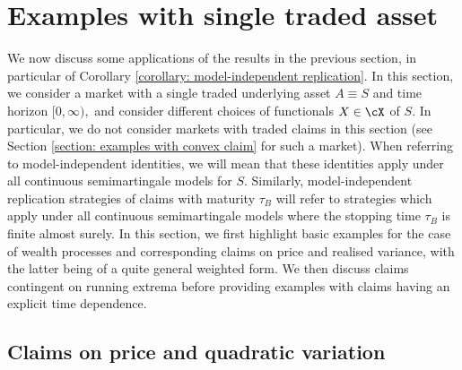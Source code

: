 \documentclass[11pt]{article}
\begin{document}
\section{Examples with single traded asset}
\label{section: examples}

We now discuss some applications of the results in the previous section, in particular of Corollary \ref{corollary: model-independent replication}. In this section, we consider a market with a single traded underlying asset $A \equiv S$ and time horizon $[0,\infty),$ and consider different choices of functionals $X \in \cX$ of $S$. In particular, we do not consider markets with traded claims in this section (see Section \ref{section: examples with convex claim} for such a market). When referring to model-independent identities, we will mean that these identities apply under all continuous semimartingale models for $S$. Similarly, model-independent replication strategies of claims with maturity $\tau_B$ will refer to strategies which apply under all continuous semimartingale models where the stopping time $\tau_B$ is finite almost surely. In this section, we first highlight basic examples for the case of wealth processes and corresponding claims on price and realised variance, with the latter being of a quite general weighted form. We then discuss claims contingent on running extrema before providing examples with claims having an explicit time dependence.

\subsection{Claims on price and quadratic variation}
\label{subsection: price and quadratic variation}
\end{document}
